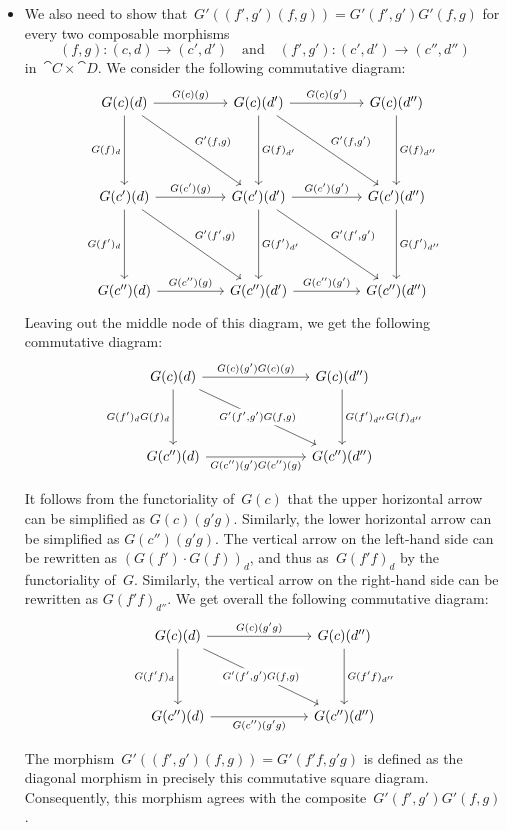 \begin{itemize}
	\item
		We also need to show that~$G'((f', g') (f, g)) = G'(f', g') G'(f, g)$ for every two composable morphisms
		\[
			(f, g) \colon (c, d) \to (c', d')
			\quad\text{and}\quad
			(f', g') \colon (c', d') \to (c'', d'')
		\]
		in~$\cat{C} × \cat{D}$.
		We consider the following commutative diagram:
		\[
			\begin{tikzcd}[column sep = huge, row sep = 5em]
				G(c)(d)
				\arrow{r}[above]{G(c)(g)}
				\arrow{d}[left]{G(f)_d}
				\arrow{dr}[above right]{G'(f, g)}
				&
				G(c)(d')
				\arrow{r}[above]{G(c)(g')}
				\arrow{d}[right]{G(f)_{d'}}
				\arrow{dr}[above right]{G'(f, g')}
				&
				G(c)(d'')
				\arrow{d}[right]{G(f)_{d''}}
				\\
				G(c')(d)
				\arrow{r}[above]{G(c')(g)}
				\arrow{d}[left]{G(f')_d}
				\arrow{dr}[above right]{G'(f', g)}
				&
				G(c')(d')
				\arrow{r}[above]{G(c')(g')}
				\arrow{d}[right]{G(f')_{d'}}
				\arrow{dr}[above right]{G'(f', g')}
				&
				G(c')(d'')
				\arrow{d}[right]{G(f')_{d''}}
				\\
				G(c'')(d)
				\arrow{r}[above]{G(c'')(g)}
				&
				G(c'')(d')
				\arrow{r}[above]{G(c'')(g')}
				&
				G(c'')(d'')
			\end{tikzcd}
		\]
		Leaving out the middle node of this diagram, we get the following commutative diagram:
		\[
			\begin{tikzcd}[row sep = 4em, column sep = 7.2em]
				G(c)(d)
				\arrow{r}[above]{G(c)(g') G(c)(g)}
				\arrow{d}[left]{G(f')_d G(f)_d}
				\arrow{dr}[description]{G'(f', g') G(f, g)}
				&
				G(c)(d'')
				\arrow{d}[right]{G(f')_{d''} G(f)_{d''}}
				\\
				G(c'')(d)
				\arrow{r}[below]{G(c'')(g') G(c'')(g)}
				&
				G(c'')(d'')
			\end{tikzcd}
		\]
	
		It follows from the functoriality of~$G(c)$ that the upper horizontal arrow can be simplified as $G(c)(g' g)$.
		Similarly, the lower horizontal arrow can be simplified as $G(c'')(g' g)$.
		The vertical arrow on the left-hand side can be rewritten as $(G(f') ⋅ G(f))_d$, and thus as~$G(f' f)_d$ by the functoriality of~$G$.
		Similarly, the vertical arrow on the right-hand side can be rewritten as $G(f' f)_{d''}$.
		We get overall the following commutative diagram:
		\[
			\begin{tikzcd}[row sep = 4em, column sep = 7em]
				G(c)(d)
				\arrow{r}[above]{G(c)(g' g)}
				\arrow{d}[left]{G(f' f)_d}
				\arrow{dr}[description]{G'(f', g') G(f, g)}
				&
				G(c)(d'')
				\arrow{d}[right]{G(f' f)_{d''}}
				\\
				G(c'')(d)
				\arrow{r}[below]{G(c'')(g' g)}
				&
				G(c'')(d'')
			\end{tikzcd}
		\]

		The morphism~$G'((f', g')(f, g)) = G'(f' f, g' g)$ is defined as the diagonal morphism in precisely this commutative square diagram.
		Consequently, this morphism agrees with the composite~$G'(f', g') G'(f, g)$.

\end{itemize}



